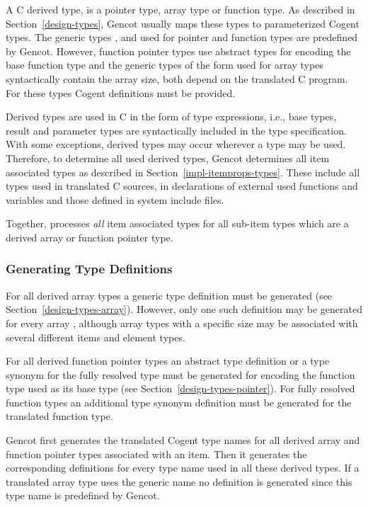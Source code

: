 A C derived type, is a pointer type, array type or function type. As described in 
Section~\ref{design-types}, Gencot usually maps these types to parameterized Cogent types. The generic types ,
 and  used for pointer and function types are predefined by Gencot. However, function
pointer types use abstract types for encoding the base function type and the generic 
types of the form  used for array types syntactically contain the array size, both
depend on the translated C program. For these types Cogent definitions must be provided.

Derived types are used in C in the form of type expressions, i.e., base types, result and parameter types are 
syntactically included in the type specification. With some exceptions, derived types may occur wherever a type
may be used. Therefore, to determine all used derived types, Gencot determines all item associated types as
described in Section~\ref{impl-itemprops-types}. These include all types used 
in translated C sources, in declarations of external used functions and variables and those defined in system
include files.

Together,  processes
\textit{all} item associated types for all sub-item types which are a derived array or function pointer type.

\subsubsection{Generating Type Definitions}

For all derived array types a generic type definition must be generated
(see Section~\ref{design-types-array}). However, only one such definition may be generated for every array , 
although array types with a specific size may be associated with several different items and element types.

For all derived function pointer types an abstract type definition or a type synonym for the fully resolved type 
must be generated for encoding the function type used as its base type (see Section~\ref{design-types-pointer}).
For fully resolved function types an additional type synonym definition must be generated for the translated function type.

Gencot first generates the translated Cogent type names for all derived array and function pointer types associated 
with an item. Then it generates the corresponding definitions for every type name
used in all these derived types. If a translated array type uses the generic name  no definition
is generated since this type name is predefined by Gencot.

